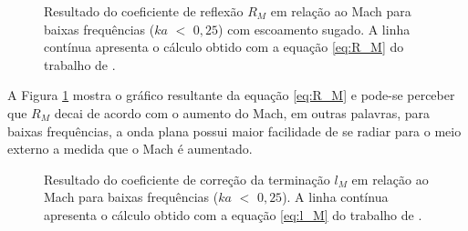 \begin{figure}[h!]
\centering
  \caption[Coeficiente de reflexão $R_{M}$ com escoamento sugado]{Resultado do coeficiente de reflexão $R_{M}$ em relação ao Mach para baixas frequências ($ka$ $<$ $0,25$) com escoamento sugado. A linha contínua apresenta o cálculo obtido com a equação \ref{eq:R_M} do trabalho de .}
  \label{fig:comp3}
\end{figure}

A Figura \ref{fig:comp3} mostra o gráfico resultante da equação \ref{eq:R_M} e pode-se perceber que $R_{M}$ decai de acordo com o aumento do Mach, em outras palavras, para baixas frequências, a onda plana possui maior facilidade de se radiar para o meio externo a medida que o Mach é aumentado. 


\begin{figure}[h!]
\centering
  \caption[Coeficiente de correção da terminação $l_{M}$]{Resultado do coeficiente de correção da terminação $l_{M}$ em relação ao Mach para baixas frequências ($ka$ $<$ $0,25$). A linha contínua apresenta o cálculo obtido com a equação \ref{eq:l_M} do trabalho de .}
  \label{fig:comp4}
\end{figure}


